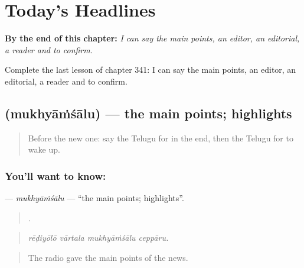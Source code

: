 
\chapter{Today's Headlines}
\label{ch:te-today-s-headlines}

\begin{chapteropening}
\textbf{By the end of this chapter:} \emph{I can say the main points, an editor, an editorial, a reader and to confirm.}

Complete the last lesson of chapter 341: I can say the main points, an editor, an editorial, a reader and to confirm.
\end{chapteropening}

\section[\texorpdfstring{\te{ముఖ్యాంశాలు} (mukhyāṁśālu)}{ముఖ్యాంశాలు (mukhyāṁśālu)}]{ (mukhyāṁśālu) — the main points; highlights}

\label{lesson:TE-C341-mukhyamsalu}



\begin{quote}
Before the new one: say the Telugu for in the end, then the Telugu for to wake up.
\end{quote}

\subsection*{You'll want to know: }
\textbf{} — \emph{mukhyāṁśālu} — \textquotedblleft{}the main points; highlights\textquotedblright{}.

\begin{quote}
   .
\end{quote}

\begin{quote}
\emph{rēḍiyōlō vārtala mukhyāṁśālu ceppāru.}
\end{quote}

\begin{quote}
The radio gave the main points of the news.
\end{quote}

